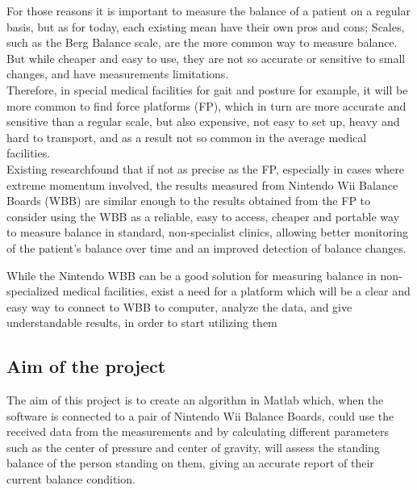 \documentclass[twoside]{ctuthesis}
\theoremstyle{plain}
\theoremstyle{definition}
\theoremstyle{note}
\begin{document}
For those reasons it is important to measure the balance of a patient on a regular basis, but as for today, each existing mean have their own pros and cons; 
Scales, such as the Berg Balance scale, are the more common way to measure balance. But while cheaper and easy to use, they are not so accurate or sensitive to small changes, and have measurements limitations\cite{Gait}. \\
Therefore, in special medical facilities for gait and posture for example, it will be more common to find force platforms (FP), which in turn are more accurate and sensitive than a regular scale, but also expensive, not easy to set up, heavy and hard to transport, and as a result not so common in the average medical facilities\cite{Gait}.\\ 
Existing research\cite{Gait}found that if not as precise as the FP, especially in cases where extreme momentum involved, the results measured from Nintendo Wii Balance Boards (WBB) are similar enough to the results obtained from the FP to consider using the WBB as a reliable, easy to access, cheaper and portable way to measure balance in standard, non-specialist clinics, allowing better monitoring of the patient's balance over time and an improved detection of balance changes.\\\par   

While the Nintendo WBB can be a good solution for measuring balance in non-specialized medical facilities, exist a need for a platform which will be a clear and easy way to connect to WBB to computer, analyze the data, and give understandable results, in order to start utilizing them


\subsection{Aim of the project}
The aim of this project is to create an algorithm in Matlab which, when the software is connected to a pair of Nintendo Wii Balance Boards, could use the received data from the measurements and by calculating different parameters such as the center of pressure and center of gravity, will assess the standing balance of the person standing on them, giving an accurate report of their current balance condition.

\pagebreak
\end{document}
